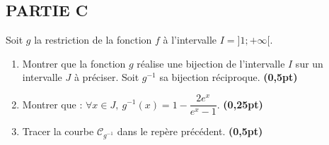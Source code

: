 \documentclass[12pt]{article}
\begin{document}
\subsection*{PARTIE C}

Soit \( g \) la restriction de la fonction \( f \) à l’intervalle \( I = ]1 ; +\infty[ \).

\begin{enumerate}
    \item Montrer que la fonction \( g \) réalise une bijection de l’intervalle \( I \) sur un intervalle \( J \) à préciser. Soit \( g^{-1} \) sa bijection réciproque. \hfill \textbf{(0,5pt)}
    
    \item Montrer que : \( \forall x \in J, \ g^{-1}(x) = 1 - \dfrac{2e^x}{e^x - 1} \). \hfill \textbf{(0,25pt)}
    
    \item Tracer la courbe \( \mathcal{C}_{g^{-1}} \) dans le repère précédent. \hfill \textbf{(0,5pt)}
\end{enumerate}
\end{document}
